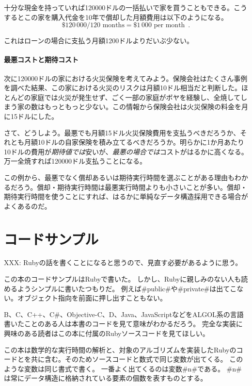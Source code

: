 十分な現金を持っていれば120000ドルの一括払いで家を買うこともできる。こうするとこの家を購入代金を10年で償却した月額費用は以下のようになる。
\[
   \$120\,000 / 120\text{ months} = \$1\,000\text{ per month} \enspace .
\]

これはローンの場合に支払う月額1200ドルよりだいぶ少ない。

\paragraph{最悪コストと期待コスト}
次に120000ドルの家における火災保険を考えてみよう。保険会社はたくさん事例を調べた結果、この家における火災のリスクは月額10ドル相当だと判断した。ほとんどの家庭では火災が発生せず、ごく一部の家庭がボヤを経験し、全焼してしまう家の数はもっともっと少ない。この情報から保険会社は火災保険の料金を月に15ドルにした。

さて、どうしよう。最悪でも月額15ドル火災保険費用を支払うべきだろうか、それとも月額10ドルの自家保険を積み立てるべきだろうか。明らかに1か月あたり10ドルの費用が\emph{期待値では}安いが、\emph{最悪の場合では}コストがはるかに高くなる。万一全焼すれば120000ドル支払うことになる。

この例から、最悪でなく償却あるいは期待実行時間を選ぶことがある理由もわかるだろう。償却・期待実行時間は最悪実行時間よりも小さいことが多い。償却・期待実行時間を使うことにすれば、はるかに単純なデータ構造採用できる場合がよくあるのだ。

\section{コードサンプル}

XXX: Rubyの話を書くことになると思うので、見直す必要があるように思う。

この本のコードサンプルはRubyで書いた。
しかし、Rubyに親しみのない人も読めるようシンプルに書いたつもりだ。
例えば#public#や#private#は出てこない。オブジェクト指向を前面に押し出すこともない。

B、C、C++、C\#、Objective-C、D、Java、JavaScriptなどをALGOL系の言語書いたことのある人は本書のコードを見て意味がわかるだろう。
完全な実装に興味のある読者はこの本に付属のRubyソースコードを見てほしい。

この本は数学的な実行時間の解析と、対象のアルゴリズムを実装したRubyのコードとを共に含む。そのためソースコードと数式で同じ変数が出てくる。
このような変数は同じ書式で書く。
一番よく出てくるのは変数#n#である。
#n#は常にデータ構造に格納されている要素の個数を表すものとする。

